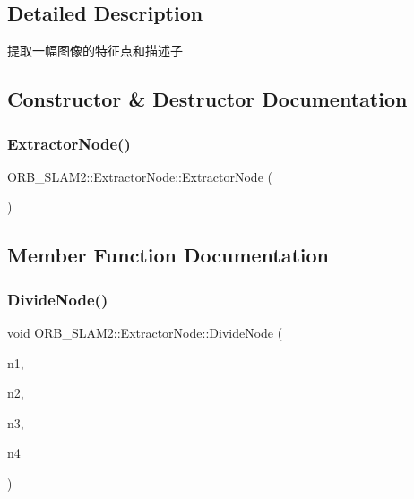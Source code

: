 \subsection{Detailed Description}
提取一幅图像的特征点和描述子 

\subsection{Constructor \& Destructor Documentation}
\mbox{\label{class_o_r_b___s_l_a_m2_1_1_extractor_node_af1920a7d5f8166debdd4a7fe4a15a8e9}} 
\subsubsection{\texorpdfstring{Extractor\+Node()}{ExtractorNode()}}
{\footnotesize\ttfamily O\+R\+B\+\_\+\+S\+L\+A\+M2\+::\+Extractor\+Node\+::\+Extractor\+Node (\begin{DoxyParamCaption}{ }\end{DoxyParamCaption})\hspace{0.3cm}{\ttfamily [inline]}}



\subsection{Member Function Documentation}
\mbox{\label{class_o_r_b___s_l_a_m2_1_1_extractor_node_ad560af26a7bab99551eab2e5c08f6535}} 
\subsubsection{\texorpdfstring{Divide\+Node()}{DivideNode()}}
{\footnotesize\ttfamily void O\+R\+B\+\_\+\+S\+L\+A\+M2\+::\+Extractor\+Node\+::\+Divide\+Node (\begin{DoxyParamCaption}\item[{\mbox{\hyperlink{class_o_r_b___s_l_a_m2_1_1_extractor_node}{Extractor\+Node}} \&}]{n1,  }\item[{\mbox{\hyperlink{class_o_r_b___s_l_a_m2_1_1_extractor_node}{Extractor\+Node}} \&}]{n2,  }\item[{\mbox{\hyperlink{class_o_r_b___s_l_a_m2_1_1_extractor_node}{Extractor\+Node}} \&}]{n3,  }\item[{\mbox{\hyperlink{class_o_r_b___s_l_a_m2_1_1_extractor_node}{Extractor\+Node}} \&}]{n4 }\end{DoxyParamCaption})}



